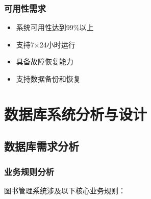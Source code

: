 \documentclass[12pt,a4paper]{article}
\begin{document}
\subsubsection{可用性需求}
\begin{itemize}
    \item 系统可用性达到99\%以上
    \item 支持7×24小时运行
    \item 具备故障恢复能力
    \item 支持数据备份和恢复
\end{itemize}

\section{数据库系统分析与设计}

\subsection{数据库需求分析}

\subsubsection{业务规则分析}
图书管理系统涉及以下核心业务规则：
\end{document}
